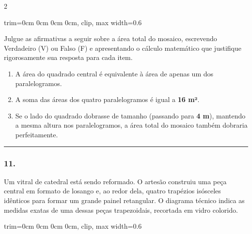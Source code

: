 \documentclass[twoside, 10pt, a4paper]{article}
\newlength{\espacoPreQuestao}\setlength{\espacoPreQuestao}{0.1cm}
\newlength{\espacoQuestao}\setlength{\espacoQuestao}{0.2cm}
\newlength{\espacoAlt}\setlength{\espacoAlt}{0.2cm}
\begin{document}
\begin{multicols*}{2}
\begin{center}
\begin{adjustbox}{trim=0cm 0cm 0cm 0cm, clip, max width=0.6\linewidth}
\end{adjustbox}
\end{center}

Julgue as afirmativas a seguir sobre a área total do mosaico, escrevendo Verdadeiro (V) ou Falso (F) e apresentando o cálculo matemático que justifique rigorosamente sua resposta para cada item.

\begin{enumerate}[label=\Roman*., itemsep=\espacoAlt]
\item A área do quadrado central é equivalente à área de apenas um dos paralelogramos.
\item A soma das áreas dos quatro paralelogramos é igual a \textbf{16 m²}.
\item Se o lado do quadrado dobrasse de tamanho (passando para \textbf{4 m}), mantendo a mesma altura nos paralelogramos, a área total do mosaico também dobraria perfeitamente.
\end{enumerate}
\par\vspace{\espacoQuestao}
\noindent\textcolor{CorLinha}{\rule{\linewidth}{0.5pt}} 
\par\vspace{\espacoPreQuestao}
\subsubsection*{11.} Um vitral de catedral está sendo reformado. O artesão construiu uma peça central em formato de losango e, ao redor dela, quatro trapézios isósceles idênticos para formar um grande painel retangular. O diagrama técnico indica as medidas exatas de uma dessas peças trapezoidais, recortada em vidro colorido.

\begin{center}
\begin{adjustbox}{trim=0cm 0cm 0cm 0cm, clip, max width=0.6\linewidth}
\end{adjustbox}
\end{center}
\end{multicols*}
\end{document}

